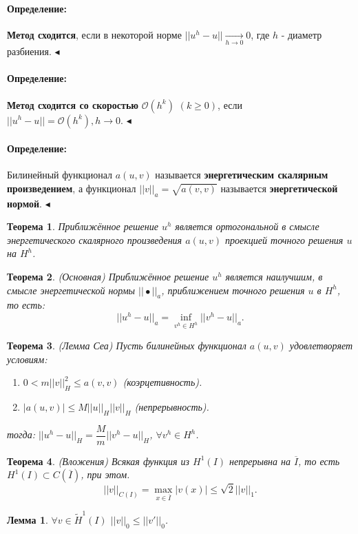 \documentclass{article}
\newtheorem{theorem}{Теорема}
\newtheorem{lemma}{Лемма}
\newenvironment{definition}{ \paragraph{Определение:}}{\hfill $\blacktriangleleft$}
\begin{document}
\begin{definition}
	\textbf{Метод сходится}, если в некоторой норме $||u^h - u|| \xrightarrow[h \to 0]{} 0$, где $h$ - диаметр разбиения.
\end{definition}

\begin{definition}
	\textbf{Метод сходится со скоростью} $\mathcal{O}(h^k)$ $(k\geqslant 0)$, если $||u^h - u|| = \mathcal{O}(h^k), h \to 0$.
\end{definition}

\begin{definition}
	Билинейный функционал $a(u,v)$ называется \textbf{энергетическим скалярным произведением}, а функционал $||v||_a = \sqrt{a(v,v)}$ называется \textbf{энергетической нормой}.
\end{definition}

\begin{theorem}
	Приближённое решение $u^h$ является ортогональной в смысле энергетического скалярного произведения $a(u,v)$ проекцией точного решения $u$ на $H^h$.
\end{theorem}

\begin{theorem}
	(Основная) Приближённое решение $u^h$ является наилучшим, в смысле энергетической нормы $||\bullet||_a$, приближением точного решения $u$ в $H^h$, то есть:
	\[
	||u^h -u||_a =\inf\limits_{v^h \in H^h} ||v^h - u||_a.
	\]
\end{theorem}

\begin{theorem}
	(Лемма Сеа)
	Пусть билинейных функционал $a(u,v)$ удовлетворяет условиям:
	\begin{enumerate}
	\item $0 < m||v||_H^2 \leqslant a(v,v)$ (коэрцетивность).
	\item $|a(u,v)| \leqslant M ||u||_H ||v||_H$ (непрерывность).
	\end{enumerate}
	тогда: $||u^h -u||_H = \dfrac{M}{m}||v^h - u||_H$, $\forall v^h \in H^h$.
\end{theorem}

\begin{theorem}
	(Вложения) Всякая функция из $H^1(I)$ непрерывна на $\overline{I}$, то есть $H^1(I) \subset C(\overline{I})$, при этом.
	\[
	||v||_{C(I)} = \max\limits_{x \in \overline{I}} |v(x)| \leqslant \sqrt{2} ||v||_1.	
	\]
\end{theorem}

\begin{lemma}
	$\forall v \in \tilde{H}^1(I)$ $||v||_0 \leqslant ||v'||_0$.
\end{lemma}
\end{document}
